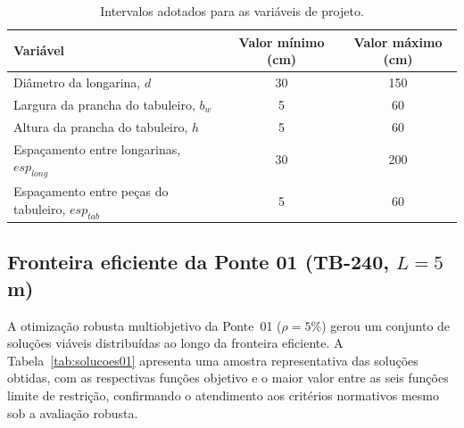 \begin{table}[!ht]
\caption{Intervalos adotados para as variáveis de projeto.\label{tab:intervalos}}
\begin{threeparttable}
\begin{tabular*}{\columnwidth}{@{\extracolsep\fill}lcc@{\extracolsep\fill}}
\toprule
Variável & Valor mínimo (cm) & Valor máximo (cm) \\
\midrule
Diâmetro da longarina, $d$ & 30 & 150 \\
Largura da prancha do tabuleiro, $b_w$ & 5 & 60 \\
Altura da prancha do tabuleiro, $h$ & 5 & 60 \\
Espaçamento entre longarinas, $esp_{long}$ & 30 & 200 \\
Espaçamento entre peças do tabuleiro, $esp_{tab}$ & 5 & 60 \\
\bottomrule
\end{tabular*}
\end{threeparttable}
\end{table}

\subsection{Fronteira eficiente da Ponte 01 (TB-240, $L = 5$ m)}\label{sec:ponte01}

A otimização robusta multiobjetivo da Ponte~01 ($\rho = 5\%$) gerou um conjunto de soluções viáveis distribuídas ao longo da fronteira eficiente. A Tabela~\ref{tab:solucoes01} apresenta uma amostra representativa das soluções obtidas, com as respectivas funções objetivo e o maior valor entre as seis funções limite de restrição, confirmando o atendimento aos critérios normativos mesmo sob a avaliação robusta.

